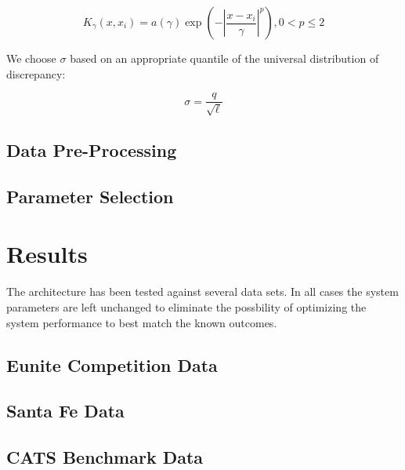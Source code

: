 \documentclass[10pt]{article}
\begin{document}
\begin{equation} K_\gamma(x,x_i) = a(\gamma) \exp \left ( - \left | \frac{x-x_i}{\gamma} \right | ^p \right ) , 0 < p \le 2 \end{equation}

We choose \( \sigma \) based on an appropriate quantile of the universal distribution of discrepancy:

\begin{equation} \sigma = \frac{q}{\sqrt \ell} \end{equation}

\subsection{Data Pre-Processing}




\subsection{Parameter Selection}


\section{Results}
The architecture has been tested against several data sets.  In all cases the system parameters are left unchanged to eliminate the possbility of optimizing the system performance to best match the known outcomes.

\subsection{Eunite Competition Data}


\subsection{Santa Fe Data}


\subsection{CATS Benchmark Data}
\end{document}

